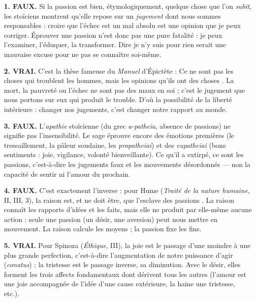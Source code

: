\documentclass[11pt]{article}
\begin{document}
\begin{corrige}

\textbf{1. FAUX.} Si la passion est bien, étymologiquement, quelque chose que l'on \emph{subit}, les stoïciens montrent qu'elle repose sur un \emph{jugement} dont nous sommes responsables : croire que l'échec est un mal absolu est une opinion que je peux corriger. Éprouver une passion n'est donc pas une pure fatalité : je peux l'examiner, l'éduquer, la transformer. Dire \guillemotleft je n'y suis pour rien \guillemotright{} serait une mauvaise excuse pour ne pas se connaître soi-même.

\textbf{2. VRAI.} C'est la thèse fameuse du \emph{Manuel} d'Épictète : \guillemotleft Ce ne sont pas les choses qui troublent les hommes, mais les opinions qu'ils ont des choses \guillemotright. La mort, la pauvreté ou l'échec ne sont pas des maux en soi ; c'est le jugement que nous portons sur eux qui produit le trouble. D'où la possibilité de la liberté intérieure : changer nos jugements, c'est changer notre rapport au monde.

\textbf{3. FAUX.} L'\emph{apathie} stoïcienne (du grec \emph{a-patheia}, absence de passions) ne signifie pas l'insensibilité. Le sage éprouve encore des émotions premières (le tressaillement, la pâleur soudaine, les \emph{propatheiai}) et des \emph{eupatheiai} (bons sentiments : joie, vigilance, volonté bienveillante). Ce qu'il a extirpé, ce sont les passions, c'est-à-dire les jugements faux et les mouvements désordonnés — non la capacité de sentir ni l'amour du prochain.

\textbf{4. FAUX.} C'est exactement l'inverse : pour Hume (\emph{Traité de la nature humaine}, II, III, 3), \guillemotleft la raison est, et ne doit être, que l'esclave des passions \guillemotright. La raison connaît les rapports d'idées et les faits, mais elle ne produit par elle-même aucune action : seule une passion (un désir, une aversion) peut nous mettre en mouvement. La raison calcule les moyens ; la passion fixe les fins.

\textbf{5. VRAI.} Pour Spinoza (\emph{Éthique}, III), la joie est le passage d'une moindre à une plus grande perfection, c'est-à-dire l'augmentation de notre puissance d'agir (\emph{conatus}) ; la tristesse est le passage inverse, sa diminution. Avec le désir, elles forment les trois affects fondamentaux dont dérivent tous les autres (l'amour est une joie accompagnée de l'idée d'une cause extérieure, la haine une tristesse, etc.).

\end{corrige}
\end{document}
